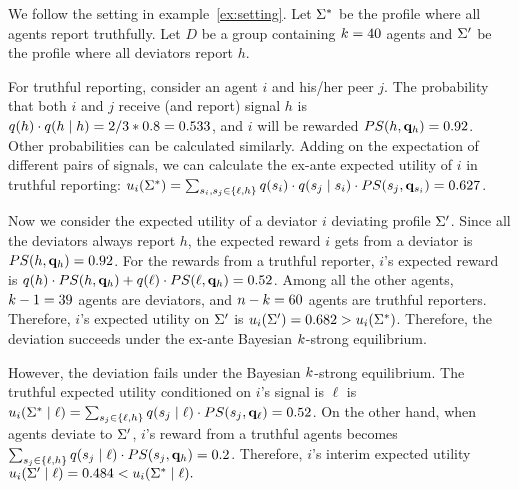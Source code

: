 \begin{example} 
\label{ex:difference}
    We follow the setting in example~\ref{ex:setting}. Let $\Sigma^*$ be the profile where all agents report truthfully. Let $D$ be a group containing $k = 40$ agents and $\Sigma'$ be the profile where all deviators report $h$. 

    For truthful reporting, consider an agent $i$ and his/her peer $j$. The probability that both $i$ and $j$ receive (and report) signal $h$ is $q(h)\cdot q(h \mid h) = 2/3 * 0.8 = 0.533$, and $i$ will be rewarded $PS(h, \mathbf{q}_h) = 0.92$. Other probabilities can be calculated similarly. Adding on the expectation of different pairs of signals, we can calculate the ex-ante expected utility of $i$ in truthful reporting: $u_i(\Sigma^*) = \sum_{s_i, s_j \in \{\ell, h\}} q(s_i) \cdot q(s_j\mid s_i)\cdot PS(s_j, \mathbf{q}_{s_i}) = 0.627$. 

    Now we consider the expected utility of a deviator $i$ deviating profile $\Sigma'$. Since all the deviators always report $h$, the expected reward $i$ gets from a deviator is $PS(h, \mathbf{q}_h) = 0.92$. For the rewards from a truthful reporter, $i$'s expected reward is $q(h)\cdot PS(h, \mathbf{q}_h) + q(\ell)\cdot PS(\ell, \mathbf{q}_h) = 0.52$. Among all the other agents, $k - 1 = 39$ agents are deviators, and $n - k = 60$ agents are truthful reporters. Therefore, $i$'s expected utility on $\Sigma'$ is $u_i(\Sigma') = 0.682 > u_i(\Sigma^*)$. Therefore, the deviation succeeds under the ex-ante Bayesian $k$-strong equilibrium. 

    However, the deviation fails under the Bayesian $k$-strong equilibrium. The truthful expected utility conditioned on $i$'s signal is $\ell$ is $u_i(\Sigma^* \mid \ell) = \sum_{s_j \in \{\ell, h\}} q(s_j\mid \ell)\cdot PS(s_j, \mathbf{q}_{\ell}) = 0.52$. On the other hand, when agents deviate to $\Sigma'$, $i$'s reward from a truthful agents becomes $\sum_{s_j \in \{\ell, h\}} q(s_j\mid \ell)\cdot PS(s_j, \mathbf{q}_{h}) = 0.2$. Therefore, $i$'s interim expected utility $u_i(\Sigma' \mid \ell) = 0.484 < u_i(\Sigma^* \mid \ell).$ 
\end{example}